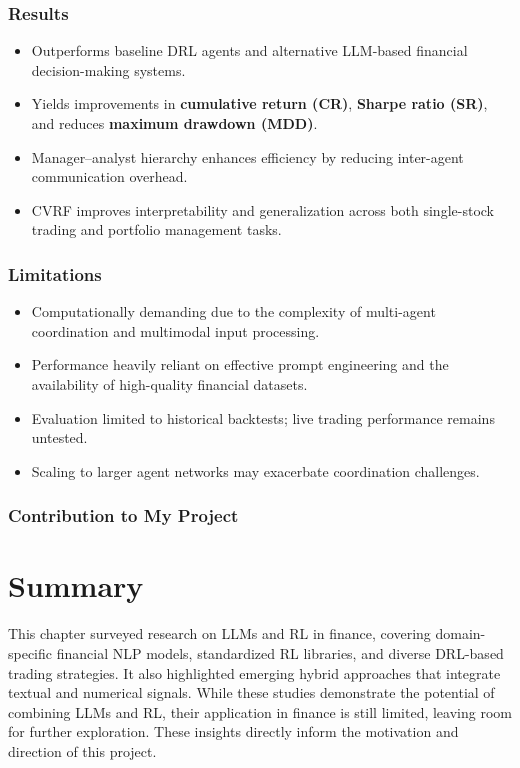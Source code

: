 \documentclass[12pt,a4paper]{report}
\begin{document}
\subsubsection{Results}
\begin{itemize}
    \item Outperforms baseline DRL agents and alternative LLM-based financial decision-making systems.  
    \item Yields improvements in \textbf{cumulative return (CR)}, \textbf{Sharpe ratio (SR)}, and reduces \textbf{maximum drawdown (MDD)}.  
    \item Manager–analyst hierarchy enhances efficiency by reducing inter-agent communication overhead.  
    \item CVRF improves interpretability and generalization across both single-stock trading and portfolio management tasks.  
\end{itemize}

\subsubsection{Limitations}
\begin{itemize}
    \item Computationally demanding due to the complexity of multi-agent coordination and multimodal input processing.  
    \item Performance heavily reliant on effective prompt engineering and the availability of high-quality financial datasets.  
    \item Evaluation limited to historical backtests; live trading performance remains untested.  
    \item Scaling to larger agent networks may exacerbate coordination challenges.  
\end{itemize}

\subsubsection{Contribution to My Project}

\section{Summary}

This chapter surveyed research on LLMs and RL in finance, covering domain-specific financial NLP models, standardized RL libraries, and diverse DRL-based trading strategies. It also highlighted emerging hybrid approaches that integrate textual and numerical signals. While these studies demonstrate the potential of combining LLMs and RL, their application in finance is still limited, leaving room for further exploration. These insights directly inform the motivation and direction of this project.
\end{document}
